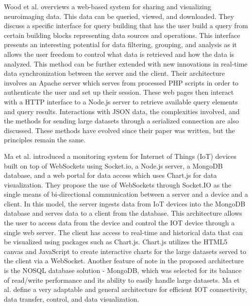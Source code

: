 Wood et al. \cite{neuro} overviews a web-based system for sharing and visualizing neuroimaging data.  This data can be queried, viewed, and downloaded.  They discuss a specific interface for query building that has the user build a query from certain building blocks representing data sources and operations.  This interface presents an interesting potential for data filtering, grouping, and analysis as it allows the user freedom to control what data is retrieved and how the data is analyzed.  This method can be further extended with new innovations in real-time data synchronization between the server and the client.  Their architecture involves an Apache server which serves from processed PHP scripts in order to authenticate the user and set up their session.  These web pages then interact with a HTTP interface to a Node.js server to retrieve available query elements and query results.  Interactions with JSON data, the complexities involved, and the methods for sending large datasets through a serialized connection are also discussed.  These methods have evolved since their paper was written, but the principles remain the same. \par
Ma et al. \cite{smartbuildings} introduced a monitoring system for Internet of Things (IoT) devices built on top of WebSockets using Socket.io, a Node.js server, a MongoDB database, and a web portal for data access which uses Chart.js for data visualization.  They propose the use of WebSockets through Socket.IO as the single means of bi-directional communication between a server and a device and a client.  In this model, the server ingests data from IoT devices into the MongoDB database and serves data to a client from the database.  This architecture allows the user to access data from the device and control the IOT device through a single web server.  The client has access to real-time and historical data that can be visualized using packages such as Chart.js.  Chart.js utilizes the HTML5 canvas and JavaScript to create interactive charts for the large datasets served to the client via a WebSocket.  Another feature of note in the proposed architecture is the NOSQL database solution - MongoDB, which was selected for its balance of read/write performance and its ability to easily handle large datasets.  Ma et al. \cite{smartbuildings}  define a very adaptable and general architecture for efficient IOT connectivity, data transfer, control, and data visualization. \par
